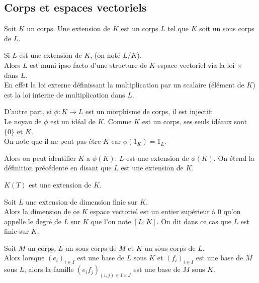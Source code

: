 \subsection{Corps et espaces vectoriels}


\begin{definition}
	Soit $K$ un corps. Une extension de $K$ est un corps $L$ tel que $K$ soit un sous corps de $L$.
\end{definition}


\begin{remarque}
	Si $L$ est une extension de $K$, (on noté $L/K$).\\
	Alors $L$ est muni ipso facto d'une structure de $K$ espace vectoriel via la loi $\times$ dans $L$.\\
	En effet la loi externe définissant la multiplication par un scalaire (élément de $K$) est la loi interne de multiplication dans $L$.

	D'autre part, si $\phi : K \to L$ est un morphisme de corps, il est injectif: \\
	Le noyau de $\phi$ est un idéal de $K$. Comme $K$ est un corps, ses seuls idéaux sont $\{0\}$ et $K$.\\
	On note que il ne peut pas être $K$ car $\phi(1_K) = 1_L$.

	Alors on peut identifier $K$ a $\phi(K)$. $L$ est une extension de $\phi(K)$. On étend la définition précédente en disant que $L$ est une extension de $K$.
\end{remarque}

\begin{example}
	$K(T)$ est une extension de $K$.
\end{example}

\begin{definition}
	Soit $L$ une extension de dimension finie sur $K$.\\
	Alors la dimension de ce $K$ espace vectoriel est un entier supérieur à 0 qu'on appelle
	le degré de $L$ sur $K$ que l'on note $[L : K]$. On dit dans ce cas que $L$ est finie sur $K$.
\end{definition}

\begin{theorem}
	Soit $M$ un corps, $L$ un sous corps de $M$ et $K$ un sous corps de $L$.\\
	Alors lorsque $(e_i)_{i\in I}$ est une base de $L$ sous $K$ et $(f_i)_{i\in I}$ est une base de $M$ sous $L$, alors la famille
	$(e_if_j)_{(i,j)\in I\times J}$ est une base de $M$ sous $K$.
\end{theorem}


